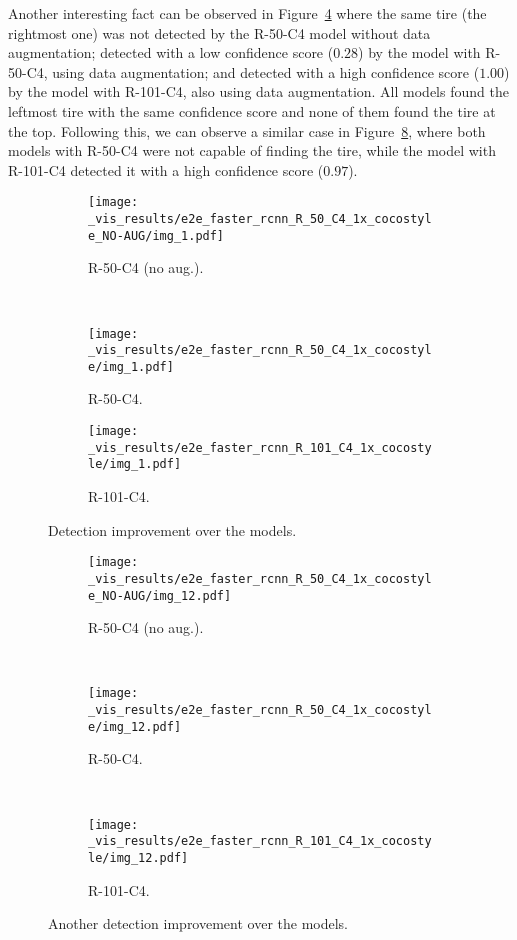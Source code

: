 %
Another interesting fact can be observed in Figure~\ref{fig:improv_1} where the same tire (the rightmost one) was not detected by the R-50-C4 model without data augmentation; detected with a low confidence score ($0.28$) by the model with R-50-C4, using data augmentation; and detected with a high confidence score ($1.00$) by the model with R-101-C4, also using data augmentation.
All models found the leftmost tire with the same confidence score and none of them found the tire at the top.
Following this, we can observe a similar case in Figure~\ref{fig:improv_2}, where both models with R-50-C4 were not capable of finding the tire, while the model with R-101-C4 detected it with a high confidence score ($0.97$).
%
\begin{figure}[th!]
  \centering
  \begin{subfigure}[t]{.9\linewidth}
    \centering
    \texttt{[image: \_vis\_results/e2e\_faster\_rcnn\_R\_50\_C4\_1x\_cocostyle\_NO-AUG/img\_1.pdf]}
    \caption{R-50-C4 (no aug.).}
    \label{fig:improv_50N}
  \end{subfigure}\\
  \begin{subfigure}[t]{0.9\linewidth}
    \centering
    \texttt{[image: \_vis\_results/e2e\_faster\_rcnn\_R\_50\_C4\_1x\_cocostyle/img\_1.pdf]}
    \caption{R-50-C4.}
    \label{fig:improv_50}
  \end{subfigure}
  \begin{subfigure}[t]{0.9\linewidth}
    \centering
    \texttt{[image: \_vis\_results/e2e\_faster\_rcnn\_R\_101\_C4\_1x\_cocostyle/img\_1.pdf]}
    \caption{R-101-C4.}
    \label{fig:improv_101}
  \end{subfigure}
  \caption{Detection improvement over the models.}
  \label{fig:improv_1}
\end{figure}
%
%
\begin{figure}[th!]
  \centering
  \begin{subfigure}[t]{.49\linewidth}
    \centering
    \texttt{[image: \_vis\_results/e2e\_faster\_rcnn\_R\_50\_C4\_1x\_cocostyle\_NO-AUG/img\_12.pdf]}
    \caption{R-50-C4 (no aug.).}
    \label{fig:improv_50N}
  \end{subfigure}~
  \begin{subfigure}[t]{0.49\linewidth}
    \centering
    \texttt{[image: \_vis\_results/e2e\_faster\_rcnn\_R\_50\_C4\_1x\_cocostyle/img\_12.pdf]}
    \caption{R-50-C4.}
    \label{fig:improv_50}
  \end{subfigure}\\
  \begin{subfigure}[t]{0.49\linewidth}
    \centering
    \texttt{[image: \_vis\_results/e2e\_faster\_rcnn\_R\_101\_C4\_1x\_cocostyle/img\_12.pdf]}
    \caption{R-101-C4.}
    \label{fig:improv_101}
  \end{subfigure}
  \caption{Another detection improvement over the models.}
  \label{fig:improv_2}
\end{figure}
%

